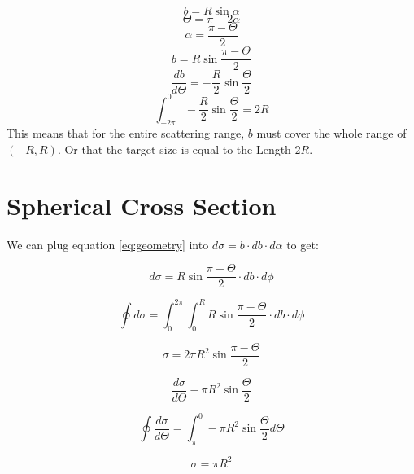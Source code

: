 \documentclass[12pt]{article}
\begin{document}
\begin{equation}
b=R{\sin{\alpha}}
\end{equation}
\begin{equation}
  \Theta=\pi-2\alpha
\end{equation}
\begin{equation}
  \alpha=\frac{\pi-\Theta}{2}
\end{equation}
\begin{equation}\label{eq:geometry}
  b=R\sin{\frac{\pi-\Theta}{2}}
\end{equation}
\begin{equation}
  \frac{{d}{b}}{{d}{\Theta}}=-\frac{R}{2}\sin{\frac{\Theta}{2}}
\end{equation}
\begin{equation}
  \int_{-2\pi}^{0}-\frac{R}{2}\sin{\frac{\Theta}{2}}=2R
\end{equation}
This means that for the entire scattering range, $b$ must cover the whole range of $(-R,R)$. Or that the target size is equal to the Length $2R$.

\pagebreak
\section{Spherical Cross Section}
We can plug equation \eqref{eq:geometry} into ${d}\sigma=b\cdot{d}b\cdot{d}\alpha$ to get:

\begin{equation}
  {d}\sigma=R\sin{\frac{\pi-\Theta}{2}}\cdot{d}b\cdot{d}\phi
\end{equation}

\begin{equation}
  \oint{d}\sigma=\int_0^{2\pi}\int_0^R R\sin{\frac{\pi-\Theta}{2}}\cdot{d}b\cdot{d}\phi
\end{equation}

\begin{equation}
  \sigma=2\pi R^2\sin{\frac{\pi-\Theta}{2}}
\end{equation}

\begin{equation}
  \frac{d\sigma}{d\Theta}-\pi{R^2}\sin{\frac{\Theta}{2}}
\end{equation}

\begin{equation}
  \oint\frac{d\sigma}{d\Theta}=\int_\pi^0-\pi{R^2}\sin{\frac{\Theta}{2}}d\Theta
\end{equation}

\begin{equation}
  \sigma=\pi R^2
\end{equation}
\end{document}
